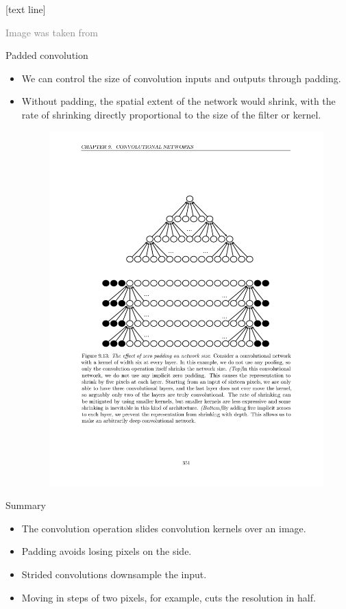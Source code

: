 \documentclass{beamer}
\newcommand{\referencefootnote}[1]{\setbeamertemplate{footline}[text line]{%
\parbox{0.9\paperwidth}{\vspace*{-23pt}\tiny{\textcolor{gray}{#1}}\hfill\scriptsize\insertframenumber}}}
\begin{document}
		{ \referencefootnote{Image was taken from \cite{goodfellow2016deep}}
    \begin{frame}{Padded convolution}
		\begin{itemize}
			\item We can control the size of convolution inputs and outputs through padding. 
			\item Without padding, the spatial extent of the network would shrink, with the rate of shrinking directly proportional to the size of the filter or kernel.  
        \begin{figure}
            \centering
            \includegraphics[width=0.45\linewidth]{figures/dl9_13.pdf}
        \end{figure}
				\end{itemize}
    \end{frame}
		}


    \begin{frame}{Summary}
        \begin{itemize}
            \item The convolution operation slides convolution kernels over an image.
            \item Padding avoids losing pixels on the side.
            \item Strided convolutions downsample the input.
            \item Moving in steps of two pixels, for example, cuts the resolution in half.
        \end{itemize}
    \end{frame}
\end{document}
